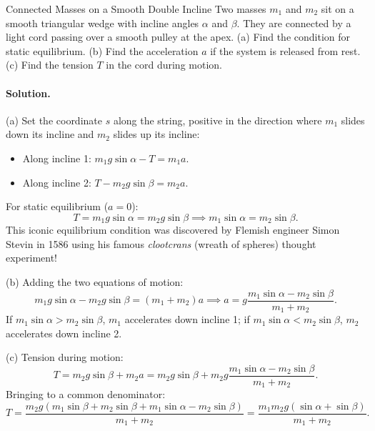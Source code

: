 \begin{workedexample}{Connected Masses on a Smooth Double Incline}
Two masses $m_1$ and $m_2$ sit on a smooth triangular wedge with incline angles $\alpha$ and $\beta$. They are connected by a light cord passing over a smooth pulley at the apex.
(a) Find the condition for static equilibrium.
(b) Find the acceleration $a$ if the system is released from rest.
(c) Find the tension $T$ in the cord during motion.

\paragraph{Solution.}

(a) Set the coordinate $s$ along the string, positive in the direction where $m_1$ slides down its incline and $m_2$ slides up its incline:
\begin{itemize}[leftmargin=1.4em,itemsep=2pt]
  \item Along incline 1: $m_1 g\sin\alpha - T = m_1 a$.
  \item Along incline 2: $T - m_2 g\sin\beta = m_2 a$.
\end{itemize}
For static equilibrium ($a = 0$):
\[
T = m_1 g\sin\alpha = m_2 g\sin\beta \implies \boxed{m_1\sin\alpha = m_2\sin\beta.}
\]
This iconic equilibrium condition was discovered by Flemish engineer Simon Stevin in 1586 using his famous \emph{clootcrans} (wreath of spheres) thought experiment!

(b) Adding the two equations of motion:
\[
m_1 g\sin\alpha - m_2 g\sin\beta = (m_1 + m_2)a \implies \boxed{a = g\frac{m_1\sin\alpha - m_2\sin\beta}{m_1 + m_2}.}
\]
If $m_1\sin\alpha > m_2\sin\beta$, $m_1$ accelerates down incline 1; if $m_1\sin\alpha < m_2\sin\beta$, $m_2$ accelerates down incline 2.

(c) Tension during motion:
\[
T = m_2 g\sin\beta + m_2 a = m_2 g\sin\beta + m_2 g\frac{m_1\sin\alpha - m_2\sin\beta}{m_1 + m_2}.
\]
Bringing to a common denominator:
\[
T = \frac{m_2 g(m_1\sin\beta + m_2\sin\beta + m_1\sin\alpha - m_2\sin\beta)}{m_1 + m_2} = \boxed{\frac{m_1 m_2 g(\sin\alpha + \sin\beta)}{m_1 + m_2}.}
\]
\end{workedexample}

